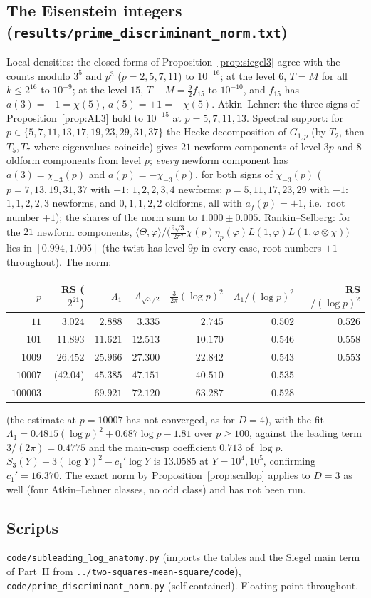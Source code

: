 \documentclass[11pt]{amsart}
\theoremstyle{remark}
\begin{document}
\subsection{The Eisenstein integers (\texttt{results/prime\_discriminant\_norm.txt})}
Local densities: the closed forms of Proposition~\ref{prop:siegel3} agree with the counts modulo $3^5$ and $p^3$ ($p=2,5,7,11$) to $10^{-16}$; at the level $6$, $T=M$ for all $k\le2^{16}$ to $10^{-9}$; at the level $15$, $T-M=\frac92f_{15}$ to $10^{-10}$, and $f_{15}$ has $a(3)=-1=\chi(5)$, $a(5)=+1=-\chi(5)$. Atkin--Lehner: the three signs of Proposition~\ref{prop:AL3} hold to $10^{-15}$ at $p=5,7,11,13$. Spectral support: for $p\in\{5,7,11,13,17,19,23,29,31,37\}$ the Hecke decomposition of $G_{1,p}$ (by $T_2$, then $T_5,T_7$ where eigenvalues coincide) gives $21$ newform components of level $3p$ and $8$ oldform components from level $p$; \emph{every} newform component has $a(3)=\chi_{-3}(p)$ and $a(p)=-\chi_{-3}(p)$, for both signs of $\chi_{-3}(p)$ ($p=7,13,19,31,37$ with $+1$: $1,2,2,3,4$ newforms; $p=5,11,17,23,29$ with $-1$: $1,1,2,2,3$ newforms, and $0,1,1,2,2$ oldforms, all with $a_f(p)=+1$, i.e.\ root number $+1$); the shares of the norm sum to $1.000\pm0.005$. Rankin--Selberg: for the $21$ newform components, $\langle\Theta,\varphi\rangle/\bigl(\frac{9\sqrt3}{2\pi^2}\chi(p)\eta_p(\varphi)L(1,\varphi)L(1,\varphi\otimes\chi)\bigr)$ lies in $[0.994,1.005]$ (the twist has level $9p$ in every case, root numbers $+1$ throughout). The norm:
\begin{center}\small
\begin{tabular}{r|rrrr|rr}
\toprule
$p$ & RS ($2^{21}$) & $\Lambda_1$ & $\Lambda_{\sqrt3/2}$ & $\frac3{2\pi}(\log p)^2$ & $\Lambda_1/(\log p)^2$ & RS$/(\log p)^2$\\
\midrule
$11$ & $3.024$ & $2.888$ & $3.335$ & $2.745$ & $0.502$ & $0.526$\\
$101$ & $11.893$ & $11.621$ & $12.513$ & $10.170$ & $0.546$ & $0.558$\\
$1009$ & $26.452$ & $25.966$ & $27.300$ & $22.842$ & $0.543$ & $0.553$\\
$10007$ & ($42.04$) & $45.385$ & $47.151$ & $40.510$ & $0.535$ & \\
$100003$ & & $69.921$ & $72.120$ & $63.287$ & $0.528$ & \\
\bottomrule
\end{tabular}
\end{center}
(the estimate at $p=10007$ has not converged, as for $D=4$), with the fit $\Lambda_1=0.4815(\log p)^2+0.687\log p-1.81$ over $p\ge100$, against the leading term $3/(2\pi)=0.4775$ and the main-cusp coefficient $0.713$ of $\log p$. $S_3(Y)-3(\log Y)^2-c_1'\log Y$ is $13.0585$ at $Y=10^4,10^5$, confirming $c_1'=16.370$. The exact norm by Proposition~\ref{prop:scallop} applies to $D=3$ as well (four Atkin--Lehner classes, no odd class) and has not been run.

\subsection*{Scripts}
\texttt{code/subleading\_log\_anatomy.py} (imports the tables and the Siegel main term of Part~II from \texttt{../two-squares-mean-square/code}), \texttt{code/prime\_discriminant\_norm.py} (self-contained). Floating point throughout.
\end{document}
